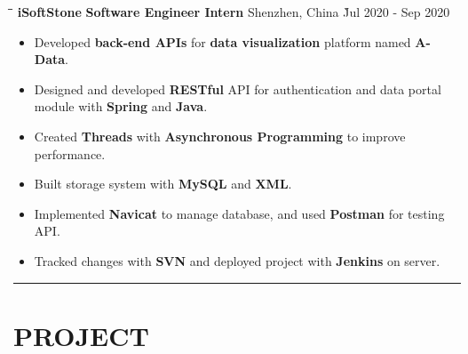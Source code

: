 \documentclass{res}
\begin{document}
\begin{resume}
    \vspace{-0.05in}	
    \begin{tabbing}
    \hspace{2.3in}\= \hspace{2.2in}\= \hspace{1.6in}\= \kill %
    {\bf iSoftStone} \> {\bf Software Engineer Intern}  \>  
                                    Shenzhen, China   \` Jul 2020 - Sep 2020\\
    \end{tabbing}\vspace{-20pt}      %
    \vspace{+0.1in}
    \begin{itemize} \itemsep 1.5pt %
        \item Developed {\bf back-end APIs} for {\bf data visualization} 
        platform named {\bf A-Data}.
        \item Designed and developed {\bf RESTful} API for authentication and 
                data portal module with {\bf Spring} and {\bf Java}.
        \item Created {\bf Threads} with {\bf Asynchronous Programming} to 
                improve performance.
        \item Built storage system with {\bf MySQL} and {\bf XML}.
        \item Implemented {\bf Navicat} to manage database, and used {\bf Postman} for testing API.
        \item Tracked changes with {\bf SVN} and deployed project with {\bf Jenkins} 
                on server.
    \end{itemize}

\vspace{+0.05in}

\vspace{-8pt}
\hspace{-0.55in}
\noindent\rule[0.25\baselineskip]{19.36cm}{0.5pt}    
        
\vspace{-0.2in}
\section{PROJECT}


\end{resume}
\end{document}
